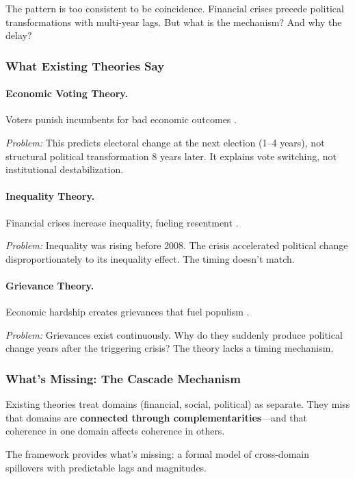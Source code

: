 The pattern is too consistent to be coincidence. Financial crises precede political 
transformations with multi-year lags. But what is the mechanism? And why the delay?

\subsubsection{What Existing Theories Say}

\paragraph{Economic Voting Theory.}
Voters punish incumbents for bad economic outcomes \citep{fiorina1981retrospective}.

\textit{Problem:} This predicts electoral change at the next election (1--4 years), 
not structural political transformation 8 years later. It explains vote switching, 
not institutional destabilization.

\paragraph{Inequality Theory.}
Financial crises increase inequality, fueling resentment \citep{piketty2014capital}.

\textit{Problem:} Inequality was rising before 2008. The crisis accelerated 
political change disproportionately to its inequality effect. The timing 
doesn't match.

\paragraph{Grievance Theory.}
Economic hardship creates grievances that fuel populism \citep{inglehart2016trump}.

\textit{Problem:} Grievances exist continuously. Why do they suddenly produce 
political change years after the triggering crisis? The theory lacks a 
timing mechanism.

\subsubsection{What's Missing: The Cascade Mechanism}

Existing theories treat domains (financial, social, political) as separate.
They miss that domains are \textbf{connected through complementarities}---and 
that coherence in one domain affects coherence in others.

The framework provides what's missing: a formal model of cross-domain spillovers 
with predictable lags and magnitudes.

